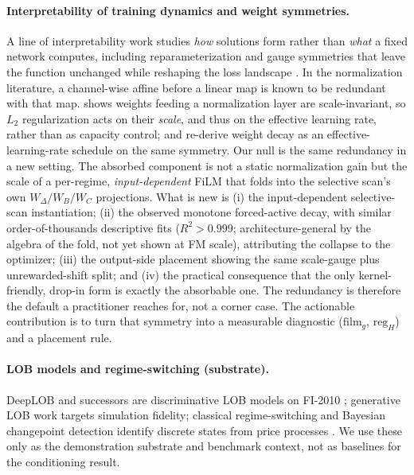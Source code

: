 \documentclass{article}
\begin{document}
\paragraph{Interpretability of training dynamics and weight symmetries.}
A line of interpretability work studies \emph{how} solutions form rather than
\emph{what} a fixed network computes, including reparameterization and gauge
symmetries that leave the function unchanged while reshaping the loss landscape
\citep{dinh2017sharp}. In the normalization literature, a channel-wise affine before a linear map is known to be redundant with that map.
\citet{vanlaarhoven2017l2} shows weights feeding a normalization layer are
scale-invariant, so $L_2$ regularization acts on their \emph{scale}, and thus on
the effective learning rate, rather than as capacity control;
\citet{hoffer2018norm} and \citet{li2020exp} re-derive weight decay as an
effective-learning-rate schedule on the same symmetry. Our null is the same redundancy in a new setting. The absorbed component is
not a static normalization gain but the scale of a per-regime, \emph{input-dependent}
FiLM that folds into the selective scan's own $W_\Delta/W_B/W_C$ projections. What is new is
(i) the input-dependent selective-scan instantiation; (ii) the observed monotone
forced-active decay, with similar order-of-thousands descriptive fits
($R^2>0.999$; architecture-general by the algebra of the fold, not yet shown at FM
scale), attributing the collapse to the optimizer; (iii) the output-side placement
showing the same scale-gauge plus unrewarded-shift split;
and (iv) the practical consequence that the only kernel-friendly, drop-in form is
exactly the absorbable one. The redundancy is therefore the default a practitioner
reaches for, not a corner case. The actionable contribution is to turn that
symmetry into a measurable diagnostic ($\mathrm{film}_g$, $\mathrm{reg}_H$) and a
placement rule.

\paragraph{LOB models and regime-switching (substrate).}
DeepLOB \citep{zhang2019deeplob} and successors are discriminative LOB models on
FI-2010 \citep{ntakaris2018benchmark}; generative LOB work
\citep{nagy2023lobs5, backhouse2025painting} targets simulation fidelity;
classical regime-switching and Bayesian changepoint detection identify discrete
states from price processes \citep{hamilton1989new, adams2007bayesian}. We use
these only as the demonstration substrate and benchmark context, not as baselines
for the conditioning result.
\end{document}
